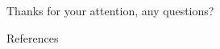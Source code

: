 \documentclass[10pt]{beamer}
\begin{document}
\begin{frame}[standout]
  Thanks for your attention, any questions?
  \vspace{3em}
  \begin{center}
    \ccby
  \end{center}
\end{frame}

\begin{frame}[allowframebreaks]{References}
  
  
\end{frame}


\end{document}
